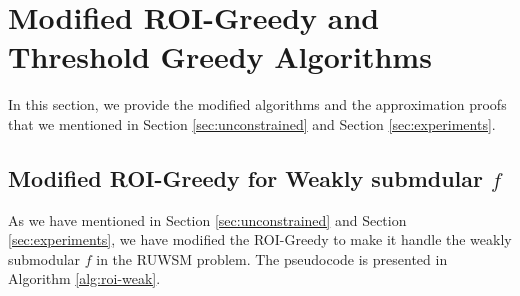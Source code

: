 \documentclass[10pt]{article} %
\theoremstyle{remark}
\newcommand{\OPT}{{\rm OPT}}
\newenvironment{manuallemma}[1]{%
  \renewcommand\themanuallemmainner{#1}%
  \manuallemmainner
}{\endmanuallemmainner}
\begin{document}








\section{Modified ROI-Greedy and Threshold Greedy Algorithms}
\label{sec:modified-algorithms}
In this section, we provide the modified algorithms and the approximation proofs that we mentioned in Section \ref{sec:unconstrained} and Section \ref{sec:experiments}.

\subsection{Modified ROI-Greedy for Weakly submdular $f$}
\label{sec:modified-roi}
As we have mentioned in Section \ref{sec:unconstrained} and Section \ref{sec:experiments}, we have modified the ROI-Greedy \cite{jin2021unconstrained} to make it handle the weakly submodular $f$ in the RUWSM problem. The pseudocode is presented in Algorithm \ref{alg:roi-weak}.
\end{document}
